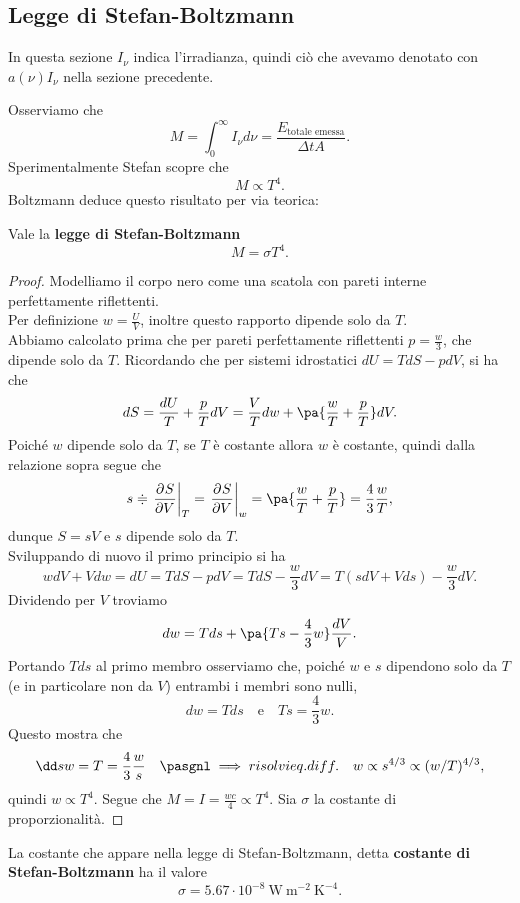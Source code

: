 \subsection{Legge di Stefan-Boltzmann}
In questa sezione $I_\nu$ indica l'irradianza, quindi ci\`o che avevamo denotato con $a(\nu)I_\nu$ nella sezione precedente.

\noindent
Osserviamo che
\[M=\int_0^\infty I_\nu d\nu=\frac{E_{\text{totale emessa}}}{\Delta t A}.\]
Sperimentalmente Stefan scopre che
\[M\propto T^4.\]
Boltzmann deduce questo risultato per via teorica:

\begin{theorem}\label{LeggeStefanBoltzmann}
Vale la \textbf{legge di Stefan-Boltzmann}
\[M=\sigma T^4.\]
\end{theorem}
\begin{proof}
Modelliamo il corpo nero come una scatola con pareti interne perfettamente riflettenti.\\
Per definizione $w=\frac UV$, inoltre questo rapporto dipende solo da $T$.\\ Abbiamo calcolato prima che per pareti perfettamente riflettenti $p=\frac w3$, che dipende solo da $T$. Ricordando che per sistemi idrostatici $dU=TdS-pdV$, si ha che
\[dS=\frac {dU}T+\frac pTdV=\frac VTdw+\pa{\frac wT+\frac pT}dV.\]
Poich\'e $w$ dipende solo da $T$, se $T$ \`e costante allora $w$ \`e costante, quindi dalla relazione sopra segue che
\[s\doteqdot\ppb VST=\ppb VSw=\pa{\frac wT+\frac pT}=\frac 43 \frac wT,\]
dunque $S=sV$ e $s$ dipende solo da $T$.\\
Sviluppando di nuovo il primo principio si ha
\[wdV+Vdw=dU=TdS-pdV=TdS-\frac w3dV=T(sdV+Vds)-\frac w3dV.\]
Dividendo per $V$ troviamo
\[dw=Tds+\pa{Ts-\frac 43w}\frac{dV}V.\]
Portando $Tds$ al primo membro osserviamo che,
poich\'e $w$ e $s$ dipendono solo da $T$ (e in particolare non da $V$) entrambi i membri sono nulli, 
\[dw=Tds\quad\text{e}\quad Ts=\frac 43w.\]
Questo mostra che
\[\dd sw=T=\frac 43\frac ws\quad\pasgnl\implies{risolvi eq. diff.}\quad w\propto s^{4/3}\propto (w/T)^{4/3},\]
quindi $w\propto T^4$.
Segue che $M=I=\frac{wc}4\propto T^4$. Sia $\sigma$ la costante di proporzionalit\`a.
\end{proof}

\begin{fact}
La costante che appare nella legge di Stefan-Boltzmann, detta \textbf{costante di Stefan-Boltzmann} ha il valore
\[\sigma=5.67\cdot 10^{-8} \ \mathrm{W}\ \mathrm{m}^{-2}\ \mathrm{K}^{-4}.\]
\end{fact}



